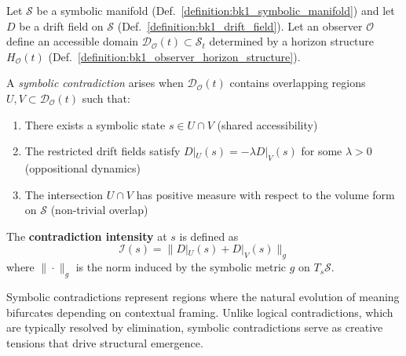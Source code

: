\begin{definition}
\label{definition:bk1_symbolic_contradiction}
Let $\mathcal{S}$ be a symbolic manifold (Def.~\ref{definition:bk1_symbolic_manifold}) and let $D$ be a drift field on $\mathcal{S}$ (Def.~\ref{definition:bk1_drift_field}). Let an observer $\mathcal{O}$ define an accessible domain $\mathcal{D}_\mathcal{O}(t) \subset \mathcal{S}_t$ determined by a horizon structure $H_\mathcal{O}(t)$ (Def.~\ref{definition:bk1_observer_horizon_structure}).

A \emph{symbolic contradiction} arises when $\mathcal{D}_\mathcal{O}(t)$ contains overlapping regions $U, V \subset \mathcal{D}_\mathcal{O}(t)$ such that:
\begin{enumerate}
    \item There exists a symbolic state $s \in U \cap V$ (shared accessibility)
    \item The restricted drift fields satisfy \( D|_U(s) = -\lambda D|_V(s) \) for some \( \lambda > 0 \) (oppositional dynamics)
    \item The intersection \( U \cap V \) has positive measure with respect to the volume form on \( \mathcal{S} \) (non-trivial overlap)
\end{enumerate}

The \textbf{contradiction intensity} at \( s \) is defined as
\[
\mathcal{I}(s) = \|D|_U(s) + D|_V(s)\|_g
\]
where \( \|\cdot\|_g \) is the norm induced by the symbolic metric \( g \) on \( T_s\mathcal{S} \).
\end{definition}

Symbolic contradictions represent regions where the natural evolution of meaning bifurcates depending on contextual framing. Unlike logical contradictions, which are typically resolved by elimination, symbolic contradictions serve as creative tensions that drive structural emergence.

